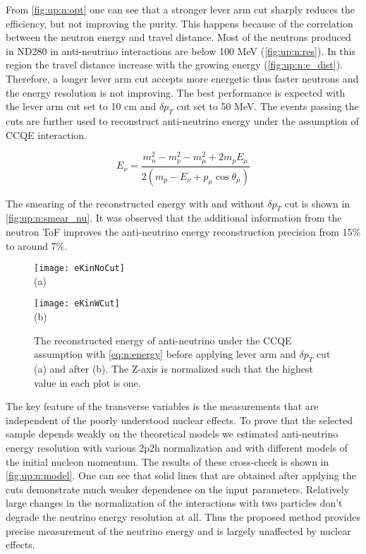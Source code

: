 \documentclass[main.tex]{subfiles}
\begin{document}
From \autoref{fig:up:n:opt} one can see that a stronger lever arm cut sharply reduces the efficiency, but not improving the purity. This happens because of the correlation between the neutron energy and travel distance. Most of the neutrons produced in ND280 in anti-neutrino interactions are below 100 MeV (\autoref{fig:up:n:res}). In this region the travel distance increase with the growing energy (\autoref{fig:up:n:e_dist}). Therefore, a longer lever arm cut accepts more energetic thus faster neutrons and the energy resolution is not improving. The best performance is expected with the lever arm cut set to 10 cm and $\delta p_T$ cut set to 50 MeV. The events passing the cuts are further used to reconstruct anti-neutrino energy under the assumption of CCQE interaction.

\begin{equation}
  \label{eq:n:energy}
  E_\nu=\frac{m^2_n-m^2_p-m^2_\mu+2m_p E_\mu}{2\left(m_p-E_\nu+p_\mu \cos\theta_\mu\right)}
\end{equation}

The smearing of the reconstructed energy with and without $\delta p_T$ cut is shown in \autoref{fig:up:n:smear_nu}. It was observed that the additional information from the neutron ToF improves the anti-neutrino energy reconstruction precision from 15\% to around 7\%.

\begin{figure}[!ht]
  \centering
  \begin{minipage}{0.49\linewidth}
    \centering
    \texttt{[image: eKinNoCut]} \\ (a)
  \end{minipage}
  \begin{minipage}{0.49\linewidth}
    \centering
    \texttt{[image: eKinWCut]} \\ (b)
  \end{minipage}
  \caption{The reconstructed energy of anti-neutrino under the CCQE assumption with \autoref{eq:n:energy} before applying lever arm and $\delta p_T$ cut (a) and after (b). The Z-axis is normalized such that the highest value in each plot is one.}
  \label{fig:up:n:smear_nu}
\end{figure}

The key feature of the transverse variables is the measurements that are independent of the poorly understood nuclear effects. To prove that the selected sample depends weakly on the theoretical models we estimated anti-neutrino energy resolution with various 2p2h normalization and with different models of the initial nucleon momentum. The results of these cross-check is shown in \autoref{fig:up:n:model}. One can see that solid lines that are obtained after applying the cuts demonstrate much weaker dependence on the input parameters. Relatively large changes in the normalization of the interactions with two particles don't degrade the neutrino energy resolution at all. Thus the proposed method provides precise measurement of the neutrino energy and is largely unaffected by nuclear effects.
\end{document}
